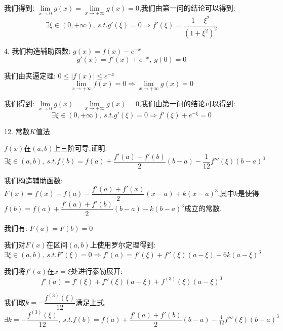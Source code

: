 \begin{solution}
	我们得到: $\lim\limits_{x\rightarrow 0 }g(x)=\lim\limits_{x\rightarrow  +\infty}g(x)=0$,我们由第一问的结论可以得到:
	$$\exists\xi\in(0,+\infty),\ s.t. g'(\xi)=0\Rightarrow f'(\xi)=\dfrac{1-\xi^2}{(1+\xi^2)^2}$$


	4. 我们构造辅助函数: $g(x)=f(x)-e^{-x}$
	$$g'(x)=f'(x)+e^{-x},\ g(0)=0$$

	我们由夹逼定理: $0\leq |f(x)|\leq e^{-x}$
	$$\lim\limits_{x\rightarrow +\infty}f(x)=0\Rightarrow \lim\limits_{x\rightarrow +\infty}g(x)=0$$

	我们得到: $\lim\limits_{x\rightarrow 0 }g(x)=\lim\limits_{x\rightarrow  +\infty}g(x)=0$,我们由第一问的结论可以得到:
	$$\exists\xi\in(0,+\infty),\ s.t. g'(\xi)=0\Rightarrow f'(\xi)+e^{-\xi}=0$$
\end{solution}


12. 常数$K$值法

\begin{proposition}
	$f(x)$在$(a,b)$上三阶可导,证明: $$\exists\xi\in(a,b),\ s.t. f(b)=f(a)+\dfrac{f'(a)+f'(b)}{2}(b-a)-\frac{1}{12}f'''(\xi)(b-a)^3$$
\end{proposition}
\begin{solution}

	我们构造辅助函数: $F(x)=f(x)-f(a)-\dfrac{f'(a)+f'(x)}{2}(x-a)+k(x-a)^3$,其中$k$是使得$f(b)=f(a)+\dfrac{f'(a)+f'(b)}{2}(b-a)-k(b-a)^3$成立的常数.

	我们有: $F(a)=F(b)=0$

	我们对$F(x)$在区间$(a,b)$上使用罗尔定理得到:
	$$\exists\xi\in(a,b),\ s.t. F'(\xi)=0\Rightarrow f'(a)=f'(\xi)+f''(\xi)(a-\xi)-6k(a-\xi)^3$$

	我们将$f'(a)$在$x=\xi$处进行泰勒展开:
	$$f'(a)=f'(\xi)+f''(\xi)(a-\xi)+f^{(3)}(\xi)(a-\xi)^3$$

	我们取$k=-\dfrac{f^{(3)}(\xi)}{12}$满足上式,$\exists k=-\dfrac{f^{(3)}(\xi)}{12},\ s.t. f(b)=f(a)+\dfrac{f'(a)+f'(b)}{2}(b-a)-\frac{1}{12}f'''(\xi)(b-a)^3$

\end{solution}

